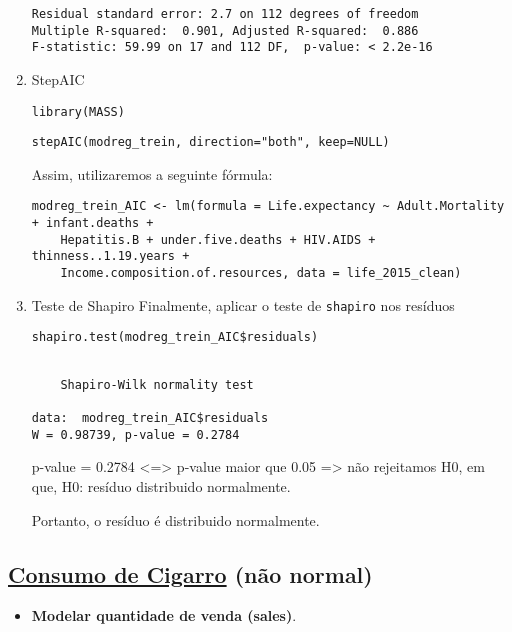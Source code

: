 \documentclass[11pt]{article}
\begin{document}
\begin{enumerate}
\begin{verbatim}
Residual standard error: 2.7 on 112 degrees of freedom
Multiple R-squared:  0.901,	Adjusted R-squared:  0.886 
F-statistic: 59.99 on 17 and 112 DF,  p-value: < 2.2e-16

\end{verbatim}

\item StepAIC
\label{sec:org2c0ae55}
\begin{verbatim}
library(MASS)
\end{verbatim}

\begin{verbatim}
stepAIC(modreg_trein, direction="both", keep=NULL)
\end{verbatim}

Assim, utilizaremos a seguinte fórmula:
\begin{verbatim}
modreg_trein_AIC <- lm(formula = Life.expectancy ~ Adult.Mortality + infant.deaths + 
    Hepatitis.B + under.five.deaths + HIV.AIDS + thinness..1.19.years + 
    Income.composition.of.resources, data = life_2015_clean)
\end{verbatim}

\item Teste de Shapiro
\label{sec:org00799f2}
Finalmente, aplicar o teste de \texttt{shapiro} nos resíduos

\begin{verbatim}
shapiro.test(modreg_trein_AIC$residuals)
\end{verbatim}

\begin{verbatim}

	Shapiro-Wilk normality test

data:  modreg_trein_AIC$residuals
W = 0.98739, p-value = 0.2784

\end{verbatim}


p-value = 0.2784 <=> p-value maior que 0.05 => não rejeitamos H0, em que, H0: resíduo distribuido normalmente.

Portanto, o resíduo é distribuido normalmente.
\end{enumerate}

\subsection{\href{https://r-data.pmagunia.com/dataset/r-dataset-package-plm-cigar}{Consumo de Cigarro} (não normal)}
\label{sec:org98ef627}
\begin{itemize}
\item \textbf{Modelar quantidade de venda (sales)}.
\end{itemize}
\end{document}
